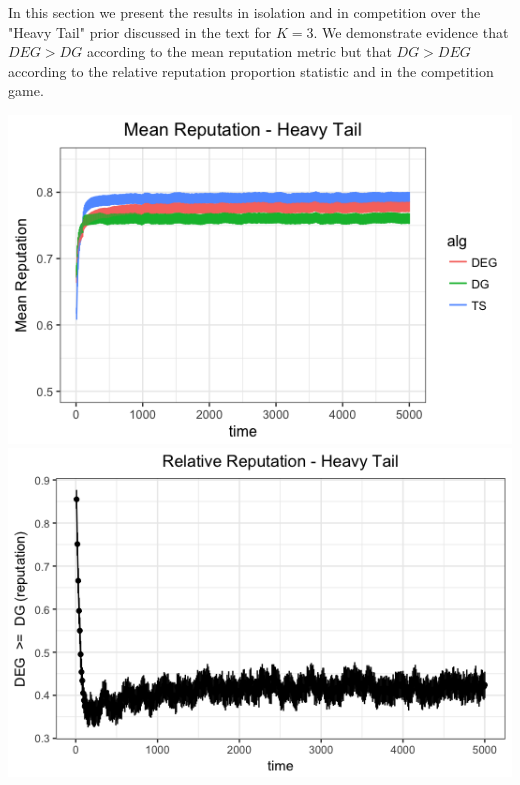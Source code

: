 \documentclass[11pt,letterpaper]{article}
\begin{document}
In this section we present the results in isolation and in competition over the "Heavy Tail" prior discussed in the text for $K = 3$. We demonstrate evidence that $DEG > DG$ according to the mean reputation metric but that $DG > DEG$ according to the relative reputation proportion statistic and in the competition game.

\begin{center}
\includegraphics[scale=0.5]{figures/mean_ht_3_arms} \\
\includegraphics[scale=0.5]{figures/rel_rep_ht_3_arms}
\end{center}
\end{document}
